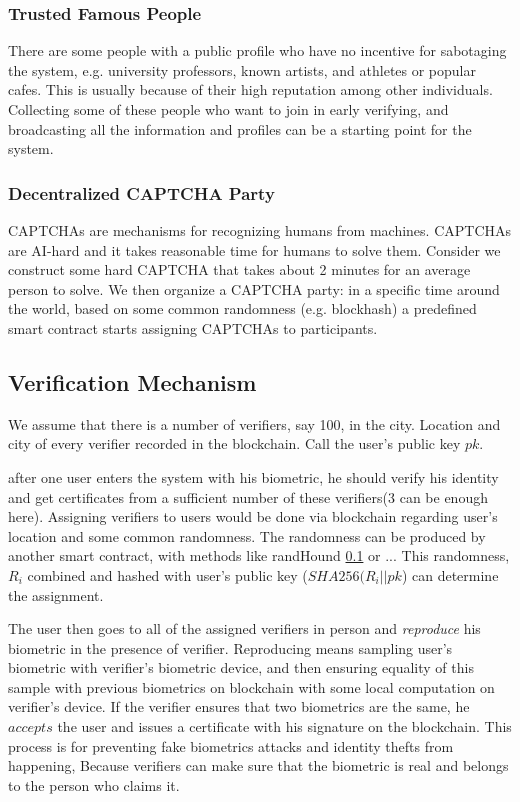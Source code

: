 \documentclass[conference]{IEEEtran}
\begin{document}
\subsubsection*{Trusted Famous People}
There are some people with a public profile who have no incentive for sabotaging the system, e.g. university professors, known artists, and athletes or popular cafes. This is usually because of their high reputation among other individuals. Collecting some of these people who want to join in early verifying, and broadcasting all the information and profiles can be a starting point for the system.

\subsubsection*{Decentralized CAPTCHA Party}
CAPTCHAs \cite{CAPTCHA} are mechanisms for recognizing humans from machines. CAPTCHAs are AI-hard and it takes reasonable time for humans to solve them. Consider we construct some hard CAPTCHA that takes about 2 minutes for an average person to solve. We then organize a CAPTCHA party: in a specific time around the world, based on some common randomness (e.g. blockhash) a predefined smart contract starts assigning CAPTCHAs to participants. 

\subsection{Verification Mechanism}
We assume that there is a number of verifiers, say 100, in the city. Location and city of every verifier recorded in the blockchain. Call the user's public key $pk$.


 after one user enters the system with his biometric, he should verify his identity and get certificates from a sufficient number of these verifiers(3 can be enough here). Assigning verifiers to users would be done via blockchain regarding user's location and some common randomness. The randomness can be produced by another smart contract, with methods like randHound \ref{} or ...   This randomness,$ R_i$ combined and hashed with user's public key ($SHA256(R_i || pk$) can determine the assignment. 
 
 
The user then goes to all of the assigned verifiers in person and \textit{reproduce}  his biometric in the presence of verifier. Reproducing means sampling user's biometric with verifier's biometric device, and then ensuring equality of this sample with previous biometrics on blockchain with some local computation on verifier's device. If the verifier ensures that two biometrics are the same, he $accepts$ the user and issues a certificate with his signature on the blockchain. This process is for  preventing fake biometrics attacks and identity thefts from happening, Because verifiers can make sure that the biometric is real and belongs to the person who claims it. 
\end{document}

